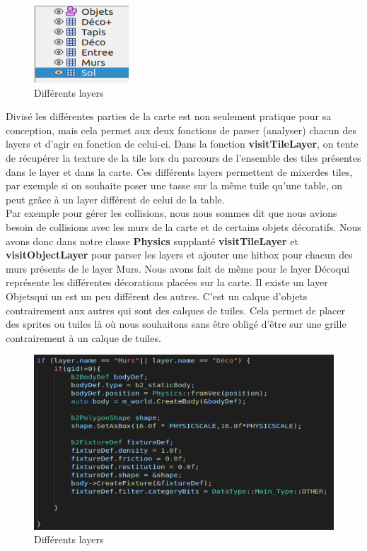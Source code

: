 \documentclass{article}
\begin{document}
\begin{figure}[ht]
    \begin{center}
    \includegraphics[scale=1]{images/Layers.png}
    \caption{Différents layers}
    \label{layers}
    \end{center}
\end{figure}
Divisé les différentes parties de la carte est non seulement pratique pour sa conception, mais cela permet aux deux fonctions de parser (analyser) chacun des layers et d'agir en fonction de celui-ci. Dans la fonction \textbf{visitTileLayer}, on tente de récupérer la texture de la tile lors du parcours de l'ensemble des tiles présentes dans le layer et dans la carte. Ces différents layers permettent de \og mixer\fg des tiles, par exemple si on souhaite poser une tasse sur la même tuile qu'une table, on peut grâce à un layer différent de celui de la table.\\
Par exemple pour gérer les collisions, nous nous sommes dit que nous avions besoin de collisions avec les murs de la carte et de certains objets décoratifs. Nous avons donc dans notre classe \textbf{Physics} supplanté \textbf{visitTileLayer} et \textbf{visitObjectLayer} pour parser les layers et ajouter une hitbox pour chacun des murs présents de le layer \og Murs\fg.
Nous avons fait de même pour le layer \og Déco\fg qui représente les différentes décorations placées sur la carte. Il existe un layer \og Objets\fg qui un est un peu différent des autres. C'est un calque d'objets contrairement aux autres qui sont des calques de tuiles. Cela permet de placer des sprites ou tuiles là où nous souhaitons sans être obligé d'être sur une grille contrairement à un calque de tuiles. 
\begin{figure}[ht]
    \begin{center}
    \includegraphics[scale=0.61]{images/physics_tile_layer.png}
    \caption{Différents layers}
    \label{physics_tile_layer}
    \end{center}
\end{figure}
\end{document}
